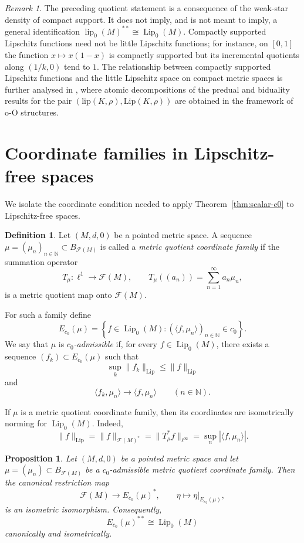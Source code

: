 \documentclass[11pt]{amsart}
\theoremstyle{plain}
\newtheorem{proposition}[theorem]{Proposition}
\theoremstyle{definition}
\newtheorem{definition}[theorem]{Definition}
\theoremstyle{remark}
\newtheorem{remark}[theorem]{Remark}
\newcommand{\Lip}{\operatorname{Lip}}
\newcommand{\lip}{\operatorname{lip}}
\newcommand{\F}{\mathcal F}
\newcommand{\N}{\mathbb N}
\begin{document}
\begin{remark}
The preceding quotient statement is a consequence of the weak-star density
of compact support. It does not imply, and is not meant to imply, a general
identification $\lip_0(M)^{**}\cong\Lip_0(M)$. Compactly supported Lipschitz
functions need not be little Lipschitz functions; for instance, on
$[0,1]$ the function $x\mapsto x(1-x)$ is compactly supported but its
incremental quotients along $(1/k,0)$ tend to $1$. The relationship between compactly supported Lipschitz functions
and the little Lipschitz space on compact metric spaces is
further analysed in \cite{AADM20}, where atomic decompositions
of the predual and biduality results for the pair
$(\mathrm{lip}(K,\rho),\mathrm{Lip}(K,\rho))$ are obtained
in the framework of o-O structures.
\end{remark}

\section{Coordinate families in Lipschitz-free spaces}

We isolate the coordinate condition needed to apply
Theorem~\ref{thm:scalar-c0} to Lipschitz-free spaces.

\begin{definition}\label{def:coordinate-quotient}
Let $(M,d,0)$ be a pointed metric space. A sequence
$\mu=(\mu_n)_{n\in\N}\subset B_{\F(M)}$ is called a \emph{metric quotient
coordinate family} if the summation operator
\[
        T_\mu:\ell^1\longrightarrow \F(M),
        \qquad
        T_\mu((a_n))=\sum_{n=1}^\infty a_n\mu_n,
\]
is a metric quotient map onto $\F(M)$.

For such a family define
\[
        E_{c_0}(\mu)=\left\{f\in\Lip_0(M):
        (\langle f,\mu_n\rangle)_{n\in\N}\in c_0\right\}.
\]
We say that $\mu$ is \emph{$c_0$-admissible} if, for every
$f\in\Lip_0(M)$, there exists a sequence $(f_k)\subset E_{c_0}(\mu)$ such
that
\[
        \sup_k\|f_k\|_{\Lip}\le \|f\|_{\Lip}
\]
and
\[
        \langle f_k,\mu_n\rangle\longrightarrow \langle f,
        \mu_n\rangle
        \qquad(n\in\N).
\]
\end{definition}

If $\mu$ is a metric quotient coordinate family, then its coordinates are
isometrically norming for $\Lip_0(M)$. Indeed,
\[
        \|f\|_{\Lip}
        =\|f\|_{\F(M)^*}
        =\|T_\mu^*f\|_{\ell^\infty}
        =\sup_n |\langle f,
        \mu_n\rangle|.
\]

\begin{proposition}\label{prop:admissible}
Let $(M,d,0)$ be a pointed metric space and let
$\mu=(\mu_n)\subset B_{\F(M)}$ be a $c_0$-admissible metric quotient
coordinate family. Then the canonical restriction map
\[
        \F(M)\longrightarrow E_{c_0}(\mu)^*,
        \qquad
        \eta\longmapsto \eta|_{E_{c_0}(\mu)},
\]
is an isometric isomorphism. Consequently,
\[
        E_{c_0}(\mu)^{**}\cong \Lip_0(M)
\]
canonically and isometrically.
\end{proposition}
\end{document}
